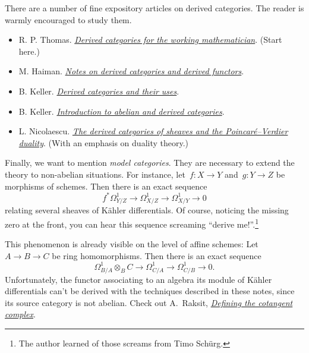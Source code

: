 \documentclass{amsart}
\theoremstyle{definition}
\theoremstyle{plain}
\theoremstyle{remark}
\newcommand{\?}{\,{:}\,}
\renewcommand{\_}{\mathpunct{.}\,}
\newcommand{\lra}{\longrightarrow}
\begin{document}
There are a number of fine expository articles on derived categories. The reader is
warmly encouraged to study them.
\begin{itemize}
\item R. P. Thomas. \href{http://arxiv.org/abs/math/0001045}{\emph{Derived
categories for the working mathematician}}. (Start here.)
\item M. Haiman.
\href{https://math.berkeley.edu/~mhaiman/math256-fall13-spring14/cohomology-1_derived-cat.pdf}{\emph{Notes
on derived categories and derived functors}}.
\item B. Keller.
\href{http://www.maths.ed.ac.uk/~aar/papers/keller.pdf}{\emph{Derived
categories and their uses}}.
\item B. Keller.
\href{http://webusers.imj-prg.fr/~bernhard.keller/publ/cam.pdf}{\emph{Introduction
to abelian and derived categories}}.
\item L. Nicolaescu.
\href{http://www3.nd.edu/~lnicolae/Verdier-ams.pdf}{\emph{The derived
categories of sheaves and the Poincaré--Verdier duality}}. (With an emphasis on
duality theory.)
\end{itemize}

Finally, we want to mention \emph{model categories}. They are necessary to
extend the theory to non-abelian situations. For instance, let~$f : X \to Y$
and~$g : Y \to Z$ be morphisms of schemes. Then there is an exact sequence
\[ f^* \Omega^1_{Y/Z} \lra \Omega^1_{X/Z} \lra \Omega^1_{X/Y} \lra 0 \]
relating several sheaves of Kähler differentials. Of course, noticing the
missing zero at the front, you can hear this sequence screaming ``derive
me!''.\footnote{The author learned of those screams from Timo Schürg.}

This phenomenon is already visible on the level of affine schemes: Let~$A \to B
\to C$ be ring homomorphisms. Then there is an exact sequence
\[ \Omega^1_{B/A} \otimes_B C \lra \Omega^1_{C/A} \lra \Omega^1_{C/B} \lra 0.
\]
Unfortunately, the functor associating to an algebra its module of Kähler
differentials can't be derived with the techniques described in these notes,
since its source category is not abelian. Check out A.~Raksit,
\href{http://www.arponr.com/files/quillen-cotangent.pdf}{\emph{Defining the
cotangent complex}}.
\end{document}
